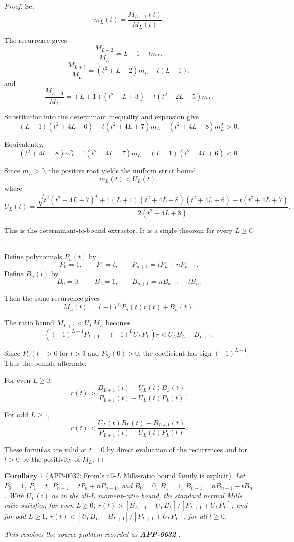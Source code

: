 \documentclass[11pt]{article}
\numberwithin{equation}{section}
\newtheorem{corollary}[theorem]{Corollary}
\theoremstyle{definition}
\theoremstyle{remark}
\newcommand{\1}{\mathbf 1}
\begin{document}
\begin{proof}
Set
\[
m_L(t)=\frac{M_{L+1}(t)}{M_L(t)}.
\]

The recurrence gives
\[
\frac{M_{L+2}}{M_L}=L+1-tm_L,
\]
\[
\frac{M_{L+3}}{M_L}=(t^2+L+2)m_L-t(L+1),
\]
and
\[
\frac{M_{L+4}}{M_L}=(L+1)(t^2+L+3)-t(t^2+2L+5)m_L.
\]

Substitution into the determinant inequality and expansion give
\[
(L+1)(t^2+4L+6)-t(t^2+4L+7)m_L-(t^2+4L+8)m_L^2>0.
\]

Equivalently,
\[
(t^2+4L+8)m_L^2+t(t^2+4L+7)m_L-(L+1)(t^2+4L+6)<0.
\]

Since \(m_L>0\), the positive root yields the uniform strict bound
\[
m_L(t)<U_L(t),
\]
where
\[
U_L(t)=
\frac{
\sqrt{t^2(t^2+4L+7)^2+4(L+1)(t^2+4L+8)(t^2+4L+6)}
-t(t^2+4L+7)
}
{2(t^2+4L+8)}.
\]

This is the determinant-to-bound extractor. It is a single theorem for every \(L\ge0\).

Define polynomials \(P_n(t)\) by
\[
P_0=1,\qquad P_1=t,\qquad P_{n+1}=tP_n+nP_{n-1}.
\]
Define \(B_n(t)\) by
\[
B_0=0,\qquad B_1=1,\qquad B_{n+1}=nB_{n-1}-tB_n.
\]

Then the same recurrence gives
\[
M_n(t)=(-1)^nP_n(t)r(t)+B_n(t).
\]

The ratio bound \(M_{L+1}<U_LM_L\) becomes
\[
\left((-1)^{L+1}P_{L+1}-(-1)^L U_LP_L\right)r
<U_LB_L-B_{L+1}.
\]

Since \(P_n(t)>0\) for \(t>0\) and \(P_{2j}(0)>0\), the coefficient has sign \((-1)^{L+1}\). Thus the bounds alternate:

For even \(L\ge0\),
\[
r(t)>
\frac{B_{L+1}(t)-U_L(t)B_L(t)}
{P_{L+1}(t)+U_L(t)P_L(t)}.
\]

For odd \(L\ge1\),
\[
r(t)<
\frac{U_L(t)B_L(t)-B_{L+1}(t)}
{P_{L+1}(t)+U_L(t)P_L(t)}.
\]

These formulas are valid at \(t=0\) by direct evaluation of the recurrences and for \(t>0\) by the positivity of \(M_L\).
\end{proof}

\begin{corollary}[APP-0032: From's all-\(L\) Mills-ratio bound family is explicit]
\label{res:from-mills-all-l-alternating-r-bound-family}
Let \(P_0=1\), \(P_1=t\), \(P_{n+1}=tP_n+nP_{n-1}\), and \(B_0=0\), \(B_1=1\), \(B_{n+1}=nB_{n-1}-tB_n\). With \(U_L(t)\) as in the all-\(L\) moment-ratio bound, the standard normal Mills ratio satisfies, for even \(L\ge0\), \(r(t)>[B_{L+1}-U_LB_L]/[P_{L+1}+U_LP_L]\), and for odd \(L\ge1\), \(r(t)<[U_LB_L-B_{L+1}]/[P_{L+1}+U_LP_L]\), for all \(t\ge0\).



This resolves the source problem recorded as \textbf{APP-0032} \cite{from-mills}.
\end{corollary}
\end{document}
